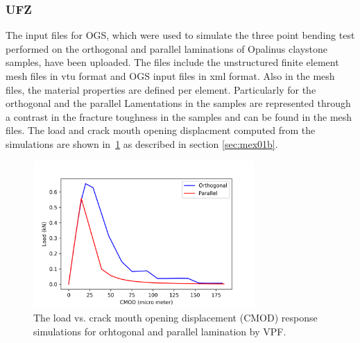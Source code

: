 \subsubsection*{UFZ}
The input files for OGS, which were used to simulate the three point bending test performed on the orthogonal and parallel laminations of Opalinus claystone samples, have been uploaded.
The files include the unstructured finite element mesh files in vtu format and OGS input files in xml format.
Also in the mesh files, the material properties are defined per element. 
Particularly for the orthogonal and the parallel Lamentations in the samples are represented through a contrast in the fracture toughness in the samples and can be found in the mesh files.
The load and crack mouth opening displacment computed from the simulations are shown in~\ref{fig:Keita_ME1_VPF_Claystone} as described in section \ref {sec:mex01b}.

\begin{figure}[!ht]
\centering
\includegraphics[width=0.75\textwidth]{figures/VPF_ME1_ex_NF_CMOD.png}
\caption{The load vs. crack mouth opening displacement (CMOD) response simulations for orhtogonal and parallel lamination by VPF.}
\label{fig:Keita_ME1_VPF_Claystone}
\end{figure}

